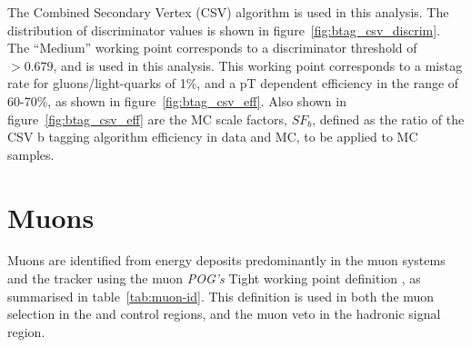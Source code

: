 The Combined Secondary Vertex (CSV) algorithm \cite{CMS-PAS-BTV-12-001} is used
in this analysis. The distribution of discriminator values is shown in
figure~\ref {fig:btag_csv_discrim}.
The ``Medium'' working point corresponds to a discriminator
threshold of $>0.679$, and is used in this analysis. This working point
corresponds
to a mistag rate for gluons/light-quarks of 1\%, and a pT dependent efficiency
in the range of 60-70\%, as shown in figure~\ref{fig:btag_csv_eff}. Also
shown in figure~\ref{fig:btag_csv_eff} are the MC scale factors, $SF_b$, defined
as the ratio of the CSV b tagging algorithm efficiency in data and MC, to be
applied to MC samples.


\section{Muons}  %
\label{sec:objects_muons}
Muons are identified from energy deposits predominantly in the muon systems and
the tracker using the muon \emph {POG's} Tight working point definition
\cite{ref:muon-id}, as summarised in table~\ref{tab:muon-id}. This definition is
used in both the muon selection in the \mj and \mmj control regions, and the
muon veto in the hadronic signal region.
% 

